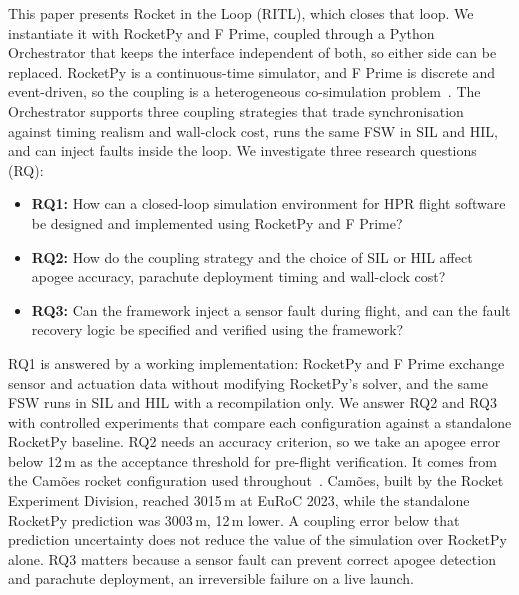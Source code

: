 This paper presents Rocket in the Loop (RITL), which closes that loop. We instantiate it with RocketPy and F Prime, coupled through a Python Orchestrator that keeps the interface independent of both, so either side can be replaced. RocketPy is a continuous-time simulator, and F Prime is discrete and event-driven, so the coupling is a heterogeneous co-simulation problem~\cite{gomes2017cosimulation}. The Orchestrator supports three coupling strategies that trade synchronisation against timing realism and wall-clock cost, runs the same FSW in SIL and HIL, and can inject faults inside the loop. We investigate three research questions (RQ):
\begin{itemize}
\item \textbf{RQ1:} How can a closed-loop simulation environment for HPR flight software be designed and implemented using RocketPy and F Prime?
\item \textbf{RQ2:} How do the coupling strategy and the choice of SIL or HIL affect apogee accuracy, parachute deployment timing and wall-clock cost?
\item \textbf{RQ3:} Can the framework inject a sensor fault during flight, and can the fault recovery logic be specified and verified using the framework?
\end{itemize}

RQ1 is answered by a working implementation: RocketPy and F Prime exchange sensor and actuation data without modifying RocketPy's solver, and the same FSW runs in SIL and HIL with a recompilation only. We answer RQ2 and RQ3 with controlled experiments that compare each configuration against a standalone RocketPy baseline. RQ2 needs an accuracy criterion, so we take an apogee error below 12\,m as the acceptance threshold for pre-flight verification. It comes from the Camões rocket configuration used throughout~\cite{rocketpy_camoes}. Camões, built by the Rocket Experiment Division, reached 3015\,m at EuRoC 2023, while the standalone RocketPy prediction was 3003\,m, 12\,m lower. A coupling error below that prediction uncertainty does not reduce the value of the simulation over RocketPy alone. RQ3 matters because a sensor fault can prevent correct apogee detection and parachute deployment, an irreversible failure on a live launch.

